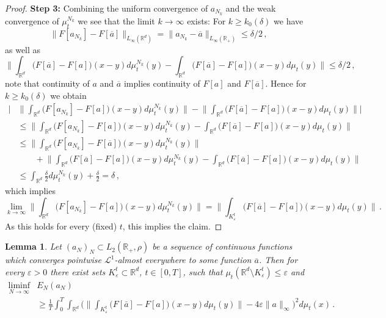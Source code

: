 \documentclass[A4paper,11pt]{article}
\newtheorem{lemma}[theorem]{Lemma}
\theoremstyle{definition}
\newcommand{\R}{\mathbb{R}}
\newcommand{\cl}{\mathcal{L}}
\begin{document}
\begin{proof}
	{\bf Step 3:} Combining the uniform convergence of $a_{N_k}$ and the weak convergence of
	$\mu_t^{N_k}$ we see that the limit $k\rightarrow\infty$ exists: For $k\geq k_0(\delta)$ we have
	\begin{equation*}
		\|F[a_{N_k}]-F[\overline a]\|_{L_\infty(\R^d)}
			=\|a_{N_k}-\overline a\|_{L_\infty(\R_+)}\leq\delta/2\,,
	\end{equation*}
	as well as
	\begin{equation*}
		\biggl\|\int_{\R^d}\bigl(F[\overline a]-F[a]\bigr)(x-y)d\mu^{N_k}_t(y)
			-\int_{\R^d}\bigl(F[\overline a]-F[a]\bigr)(x-y)d\mu_t(y)\biggr\|\leq\delta/2\,,
	\end{equation*}
	note that continuity of $a$ and $\overline a$ implies continuity of
	$F[a]$ and $F[\overline a]$. Hence for $k\geq k_0(\delta)$ we obtain
	\begin{align*}
		\Biggl|
			&\biggl\|\int_{\R^d}\bigl(F[a_{N_k}]-F[a]\bigr)(x-y)d\mu_t^{N_k}(y)\biggr\|
				-\biggl\|\int_{\R^d}\bigl(F[\overline a]-F[a]\bigr)(x-y)d\mu_t(y)\biggr\|\Biggr|\\
			&\leq\biggl\|\int_{\R^d}\bigl(F[a_{N_k}]-F[a]\bigr)(x-y)d\mu^{N_k}_t(y)
					-\int_{\R^d}\bigl(F[\overline a]-F[a]\bigr)(x-y)d\mu_t(y)\biggr\|\\
			&\leq\Biggl\|\int_{\R^d}
				\bigl(F[a_{N_k}]-F[\overline a]\bigr)(x-y)d\mu_t^{N_k}(y)\Biggr\|\\
			&\qquad +\biggl\|\int_{\R^d}\bigl(F[\overline a]-F[a]\bigr)(x-y)d\mu^{N_k}_t(y)
					-\int_{\R^d}\bigl(F[\overline a]-F[a]\bigr)(x-y)d\mu_t(y)\biggr\|\\
			&\leq\int_{\R^d}\frac{\delta}{2}d\mu_t^{N_k}(y)+\frac{\delta}{2}=\delta\,,
	\end{align*}
	which implies
	\begin{equation*}
		\lim_{k\rightarrow\infty}\Biggl\|\int_{\R^d}\bigl(F[a_{N_k}]-F[a]\bigr)(x-y)d\mu_t^{N_k}(y)\Biggr\|
			=\Biggl\|\int_{K_\varepsilon^t}\bigl(F[\overline a]-F[a]\bigr)(x-y)d\mu_t(y)\Biggr\|\,.
	\end{equation*}
	As this holds for every (fixed) $t$, this implies the claim.
\end{proof}

\begin{lemma}\label{lemma-semicontinuous-2a}
	Let $(a_N)_N\subset L_2(\R_+,\rho)$ be a sequence of continuous functions which converges pointwise
	$\cl^1$-almost everywhere to some function $\overline a$. Then for every $\varepsilon>0$ there exist sets
	$K^t_\varepsilon\subset\R^d$, $t\in [0,T]$, such that $\mu_t(\R^d\setminus K^t_\varepsilon)\leq\varepsilon$ and
	\begin{equation}\label{eq-lower-semi-2}
		\begin{split}
		\liminf_{N\rightarrow\infty}&E_N(a_N)\\
			&\geq\frac{1}{T}\int_0^T\int_{\R^d}\Biggl(\Biggl\|\int_{K^t_\varepsilon}
				\bigl(F[\bar a]-F[a]\bigr)(x-y)d\mu_t(y)\Biggr\|
				-4\varepsilon\|a\|_\infty\Biggr )^2 d\mu_t(x)\,.
		\end{split}
	\end{equation}
\end{lemma}
\end{document}
